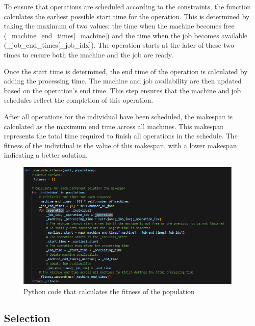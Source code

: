 \documentclass[11pt, a4paper]{article}
\begin{document}
\vspace{1em} To ensure that operations are scheduled according to the constraints, the function calculates the earliest possible start time for the operation. This is determined by taking 
the maximum of two values: the time when the machine becomes free (\_machine\_end\_times[\_machine]) and the time when the job becomes available (\_job\_end\_times[\_job\_idx]). 
The operation starts at the later of these two times to ensure both the machine and the job are ready.

\vspace{1em} Once the start time is determined, the end time of the operation is calculated by adding the processing time. The machine and job availability are then updated based on the 
operation’s end time. This step ensures that the machine and job schedules reflect the completion of this operation.

\vspace{1em} After all operations for the individual have been scheduled, the makespan is calculated as the maximum end time across all machines. This makespan represents the total time 
required to finish all operations in the schedule. The fitness of the individual is the value of this makespan, with a lower makespan indicating a better solution.

\begin{figure}[H]
    \centering
    \includegraphics[width=\textwidth]{media/evaluate_fitness.png}
    \caption{Python code that calculates the fitness of the population}
    \label{fig:image_6}
\end{figure}

\subsection{Selection}
\end{document}
